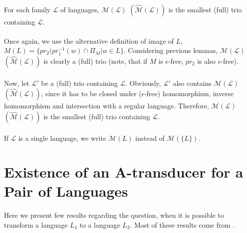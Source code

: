 \paragraph{}
\cveta For each family $\mathcal{L} $ of languages, $\mathcal{M(L)} $ $(\mathcal{\hat{M}(L)}) $ is the smallest (full) trio containing $\mathcal{L} $.

\paragraph{}
\dokaz Once again, we use the alternative definition of image of $L$, $M(L) = \{ pr_{2}(pr_{1}^{-1}(w) \cap \Pi_{M} | w \in L \}$. Considering previous lemmas, $\mathcal{M(L)} $ $(\mathcal{\hat{M}(L)}) $ is clearly a (full) trio (note, that if $M$ is $\epsilon $-free, $pr_{2}$ is also $\epsilon $-free).

\paragraph{}
Now, let $\mathcal{L'} $ be a (full) trio containing $\mathcal{L} $. Obviously, $\mathcal{L'} $ also contains $\mathcal{M(L)} $ $(\mathcal{\hat{M}(L)}) $, since it has to be closed under ($\epsilon $-free) homomorphism, inverse homomorphism and intersection with a regular language. Therefore, $\mathcal{M(L)} $ $(\mathcal{\hat{M}(L)}) $ is the smallest (full) trio containing $\mathcal{L} $. \square

\paragraph{}
\oznacenie If $\mathcal{L}$ is a single language, we write $\mathcal{M}(L)$ instead of $\mathcal{M}(\{ L\} )$.

\section{Existence of an A-transducer for a Pair of Languages}
\paragraph{}
Here we present few results regarding the question, when it is possible to transform a language $L_{1}$ to a language $L_{2}$. Most of these results come from \cite{Rovan:AFL}.
